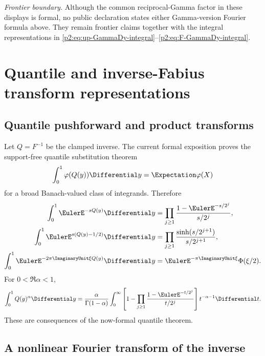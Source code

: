 \documentclass[11pt]{article}
\theoremstyle{definition}
\theoremstyle{remark}
\begin{document}
\emph{Frontier boundary.}  Although the common reciprocal-Gamma factor in these displays is
formal, no public declaration states either Gamma-version Fourier formula above.  They remain
frontier claims together with the integral representations in
\eqref{p2:eq:up-GammaDy-integral}--\eqref{p2:eq:F-GammaDy-integral}.

\section{Quantile and inverse-Fabius transform representations}
\label{p2:sec:inverse-fourier}

\subsection{Quantile pushforward and product transforms}

Let $Q=F^{-1}$ be the clamped inverse.  The current formal exposition proves the support-free
quantile substitution theorem
\begin{equation}
 \int_0^1\varphi(Q(y))\Differential y=\Expectation\varphi(X)                 \label{p2:eq:quantile-substitution}
\end{equation}
for a broad Banach-valued class of integrands.  Therefore
\begin{align}
 \int_0^1\EulerE^{-sQ(y)}\Differential y
 &=\prod_{j\ge1}\frac{1-\EulerE^{-s/2^j}}{s/2^j},             \label{p2:eq:Q-Laplace}\\
 \int_0^1\EulerE^{s(Q(y)-1/2)}\Differential y
 &=\prod_{j\ge1}\frac{\sinh(s/2^{j+1})}{s/2^{j+1}},     \label{p2:eq:Q-centered-MGF}\\
 \int_0^1\EulerE^{-2\pi\ImaginaryUnit\xi Q(y)}\Differential y
 &=\EulerE^{-\pi\ImaginaryUnit\xi}\Phi(\xi/2).                        \label{p2:eq:Q-characteristic}
\end{align}
For $0<\Re\alpha<1$,
\begin{equation}
 \int_0^1Q(y)^\alpha\Differential y
 =\frac{\alpha}{\Gamma(1-\alpha)}\int_0^\infty
 \left[1-\prod_{j\ge1}\frac{1-\EulerE^{-t/2^j}}{t/2^j}\right]
 t^{-\alpha-1}\Differential t.                                    \label{p2:eq:Q-fractional-moment}
\end{equation}
These are \Derived consequences of the now-formal quantile theorem.

\subsection{A nonlinear Fourier transform of the inverse}
\end{document}

